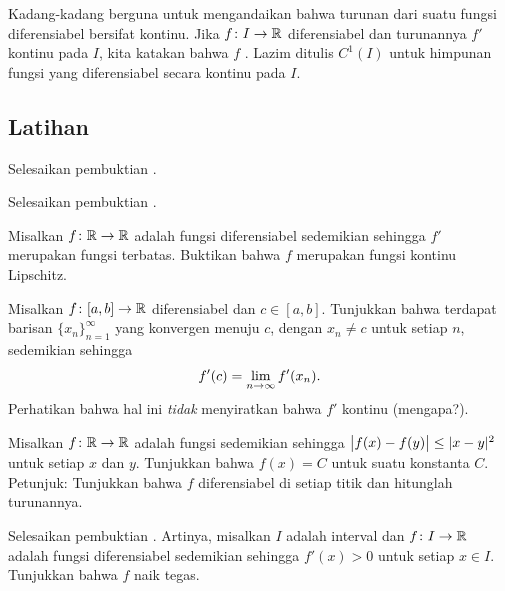 Kadang-kadang berguna untuk mengandaikan bahwa turunan dari suatu fungsi
diferensiabel bersifat kontinu.  Jika $f \colon I \to {\mathbb{R}}$ diferensiabel dan
turunannya $f'$ kontinu pada $I$, kita katakan bahwa $f$
\emph{}.  Lazim ditulis
$C^1(I)$ untuk himpunan fungsi yang diferensiabel secara kontinu
pada $I$.

\subsection{Latihan}

\begin{exercise}
Selesaikan pembuktian .
\end{exercise}

\begin{exercise}
Selesaikan pembuktian .
\end{exercise}

\begin{exercise} \label{exercise:boundeddermeanslip}
Misalkan $f \colon {\mathbb{R}} \to {\mathbb{R}}$ adalah fungsi diferensiabel
sedemikian sehingga $f'$ merupakan fungsi terbatas.  Buktikan
bahwa $f$ merupakan fungsi kontinu Lipschitz.
\end{exercise}

\begin{exercise}
\pagebreak[1]
Misalkan $f \colon [a,b] \to {\mathbb{R}}$ diferensiabel dan $c \in [a,b]$.
Tunjukkan bahwa terdapat barisan $\{ x_n \}_{n=1}^\infty$ yang konvergen menuju $c$, dengan $x_n
\neq c$ untuk setiap $n$, sedemikian sehingga
\begin{equation*}
f'(c) = \lim_{n\to \infty} f'(x_n).
\avoidbreak
\end{equation*}
Perhatikan bahwa hal ini \emph{tidak} menyiratkan bahwa $f'$ kontinu (mengapa?).
\end{exercise}

\begin{exercise}
Misalkan $f \colon {\mathbb{R}} \to {\mathbb{R}}$ adalah fungsi sedemikian sehingga
$\bigl\lvert {f(x)-f(y)} \bigr\rvert \leq \lvert {x-y} \rvert^2$ untuk setiap $x$ dan $y$.  Tunjukkan bahwa
$f(x) = C$ untuk suatu konstanta $C$.  Petunjuk: Tunjukkan bahwa $f$ diferensiabel
di setiap titik dan hitunglah turunannya.
\end{exercise}

\begin{exercise} \label{exercise:posderincr}
Selesaikan pembuktian .  Artinya,
misalkan $I$ adalah interval dan
$f \colon I \to {\mathbb{R}}$ adalah fungsi diferensiabel sedemikian sehingga
$f'(x) > 0$ untuk setiap $x \in I$.
Tunjukkan bahwa $f$ naik tegas.
\end{exercise}

